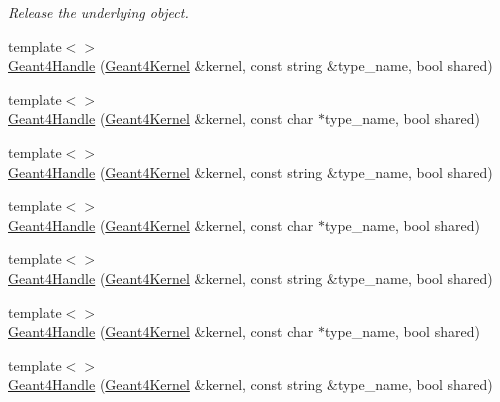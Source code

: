 \begin{DoxyCompactItemize}
\begin{DoxyCompactList}\small\item\em Release the underlying object. \end{DoxyCompactList}\item 
{\footnotesize template$<$$>$ }\\\hyperlink{class_d_d4hep_1_1_simulation_1_1_geant4_handle_a993b8c4a5557bdf6446bda3ec1dc2ceb}{Geant4\+Handle} (\hyperlink{class_d_d4hep_1_1_simulation_1_1_geant4_kernel}{Geant4\+Kernel} \&kernel, const string \&type\+\_\+name, bool shared)
\item 
{\footnotesize template$<$$>$ }\\\hyperlink{class_d_d4hep_1_1_simulation_1_1_geant4_handle_a58e768bc8de27fd5facf9ab711ab480b}{Geant4\+Handle} (\hyperlink{class_d_d4hep_1_1_simulation_1_1_geant4_kernel}{Geant4\+Kernel} \&kernel, const char $\ast$type\+\_\+name, bool shared)
\item 
{\footnotesize template$<$$>$ }\\\hyperlink{class_d_d4hep_1_1_simulation_1_1_geant4_handle_a83ceb2c01f0058d6e8704630ed7be49a}{Geant4\+Handle} (\hyperlink{class_d_d4hep_1_1_simulation_1_1_geant4_kernel}{Geant4\+Kernel} \&kernel, const string \&type\+\_\+name, bool shared)
\item 
{\footnotesize template$<$$>$ }\\\hyperlink{class_d_d4hep_1_1_simulation_1_1_geant4_handle_af0321737386265d173b882fe1403f4b8}{Geant4\+Handle} (\hyperlink{class_d_d4hep_1_1_simulation_1_1_geant4_kernel}{Geant4\+Kernel} \&kernel, const char $\ast$type\+\_\+name, bool shared)
\item 
{\footnotesize template$<$$>$ }\\\hyperlink{class_d_d4hep_1_1_simulation_1_1_geant4_handle_a34f1cab445068db4228bb0c6c6450d84}{Geant4\+Handle} (\hyperlink{class_d_d4hep_1_1_simulation_1_1_geant4_kernel}{Geant4\+Kernel} \&kernel, const string \&type\+\_\+name, bool shared)
\item 
{\footnotesize template$<$$>$ }\\\hyperlink{class_d_d4hep_1_1_simulation_1_1_geant4_handle_a8f56de22e3473bea5858f081a07a45f0}{Geant4\+Handle} (\hyperlink{class_d_d4hep_1_1_simulation_1_1_geant4_kernel}{Geant4\+Kernel} \&kernel, const char $\ast$type\+\_\+name, bool shared)
\item 
{\footnotesize template$<$$>$ }\\\hyperlink{class_d_d4hep_1_1_simulation_1_1_geant4_handle_ab90402e56522f151112db915738f56c2}{Geant4\+Handle} (\hyperlink{class_d_d4hep_1_1_simulation_1_1_geant4_kernel}{Geant4\+Kernel} \&kernel, const string \&type\+\_\+name, bool shared)

\end{DoxyCompactItemize}
